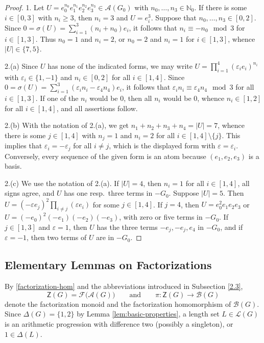 \documentclass[a4paper, 10pt]{amsart}
\theoremstyle{plain}
\theoremstyle{definition}
\theoremstyle{definition}
\newcommand{\N}{\mathbb N}
\numberwithin{equation}{section}
\begin{document}
\begin{proof}
1. Let
$U = e_0^{n_0}e_1^{n_1}e_2^{n_2}e_3^{n_3} \in \mathcal A (G_0)$ with $n_0, \ldots, n_3 \in \N_0$. If there is some $i \in [0,3]$ with $n_i \ge 3$, then $n_i=3$ and $U =e_i^3$. Suppose that $n_0, \ldots, n_3 \in [0,2]$.
Since $0 = \sigma (U) = \sum_{i=1}^3 (n_i+n_0)e_i$, it follows that $n_i \equiv -n_0 \mod 3$ for
$i \in [1,3]$.  Thus $n_0 = 1$ and $n_i = 2$, or
$n_0 = 2$ and $n_i = 1$ for $i \in [1,3]$, whence $|U| \in \{7,5\}$.

2.(a)  Since $U$ has none of the indicated forms, we may write
$U = \prod_{i=1}^{4}(\varepsilon_i e_i)^{n_i}$ with $\varepsilon_i \in \{1,-1\}$
and $n_i \in [0,2]$ for all $i \in [1,4]$.   Since 
$0 = \sigma (U) = \sum_{i=1}^3(\varepsilon_i n_i - \varepsilon_4 n_4)e_i$, it follows that 
$\varepsilon_i n_i \equiv \varepsilon_4 n_4 \mod 3$ for all $i \in [1,3]$.  If one of the  $n_i$ would be
$0$, then all $n_i$ would be $0$,  whence $n_i \in [1,2]$ for all $i \in [1,4]$, and all assertions follow.

2.(b)  With the notation of 2.(a), we get  $n_1+n_2+n_3+n_4=|U| = 7$, whence there is some $j \in [1,4]$ with $n_j=1$ and $n_i=2$ for all $i \in [1,4]\setminus \{j\}$.  This implies that  $\varepsilon_i = -\varepsilon_j$ for
all $i \ne j$, which is the displayed form with $\varepsilon = \varepsilon_i$.
Conversely, every sequence of the given form is an atom because $(e_1,e_2,e_3)$ is a basis.


2.(c)  We use the notation of 2.(a).  If $|U| = 4$, then 
$n_i = 1$ for all $i \in [1,4]$, all signs agree, and $U$ has one
resp.\ three terms in $-G_0$.  Suppose $|U| = 5$. Then
 $U = (-\varepsilon e_j)^2 \prod_{i \ne j} (\varepsilon e_i)$ for some $j \in [1,4]$.  If $j = 4$, then
 $U=e_0^2e_1e_2e_3$ or $U=(-e_0)^2(-e_1)(-e_2)(-e_3)$, with zero or five
terms in $-G_0$.  If $j \in [1,3]$ and $\varepsilon = 1$, then $U$ has the three terms
 $-e_j, -e_j, e_4$ in $-G_0$, and if $\varepsilon = -1$, then two terms of $U$ are in $-G_0$.
\end{proof}


\subsection{Elementary Lemmas on Factorizations}\label{sec:factorization-lemmas}

By \eqref{factorization-hom} and the abbreviations introduced in Subsection \ref{2.3}, 
\[
\mathsf Z (G) = \mathcal F \big(\mathcal A(G) \big)
 \qquad \text{and} \qquad
 \pi\colon \mathsf Z (G)\longrightarrow\mathcal B(G)
\]
denote the  factorization monoid and the  factorization homomorphism of $\mathcal B (G)$. 
Since $\Delta (G) = \{1,2\}$ by Lemma \ref{lem:basic-properties}, a length set  $L  \in \mathcal L (G)$ is an
arithmetic progression with difference two (possibly a singleton), or
$1 \in \Delta ( L )$.  
\end{document}
